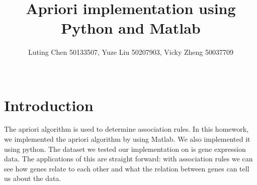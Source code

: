 \documentclass[12pt]{article}
\title{ Apriori implementation using Python and Matlab}
\author
{Luting Chen  50133507,
	Yuze Liu 50207903, 
	Vicky Zheng  50037709 \\
\\
}
\date{}
\newenvironment{sciabstract}{%
\begin{quote} \bf}
{\end{quote}}
\begin{document}
 


\baselineskip24pt


\maketitle 


\section*{Introduction}
The apriori algorithm is used to determine association rules. In this homework, we implemented the apriori algorithm by using Matlab. We also implemented it using python. The dataset we tested our implementation on is gene expression data. The applications of this are straight forward: with association rules we can see how genes relate to each other and what the relation between genes can tell us about the data. 
\end{document}
